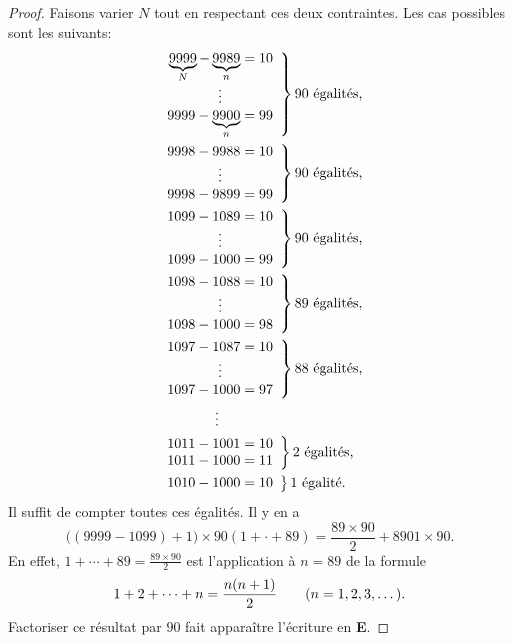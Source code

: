 \begin{proof}
Faisons varier $N$ tout en respectant ces deux contraintes. Les cas possibles sont les suivants:
%
\begin{align}
  &\left.
  \begin{array}{r@{{}={}}l}
    \underbrace{9999}_{N} - \underbrace{9989}_{n} & 10 \\
    \multicolumn{2}{c}{\vdots} \\
    9999 - \underbrace{9900}_{n} & 99
  \end{array}
  \right\} 90 \text{ égalités,}\\
%
%
%
  &\left.
  \begin{array}{r@{{}={}}l}
    9998 - 9988 & 10 \\
    \multicolumn{2}{c}{\vdots} \\
  9998 - 9899 & 99
  \end{array}
  \right\} 90 \text{ égalités,}\\
%
%
  &\left.
  \begin{array}{r@{{}={}}l}
    1099 - 1089 & 10 \\
    \multicolumn{2}{c}{\vdots} \\
  1099 - 1000 & 99
  \end{array}
  \right\} 90 \text{ égalités,}\\
%
  &\left.
  \begin{array}{r@{{}={}}l}
    1098 - 1088 & 10 \\
    \multicolumn{2}{c}{\vdots} \\
  1098 - 1000 & 98
  \end{array}
  \right\} 89 \text{ égalités,}\\
%
  &\left.
  \begin{array}{r@{{}={}}l}
    1097 - 1087 & 10 \\
    \multicolumn{2}{c}{\vdots} \\
  1097 - 1000 & 97
  \end{array}
  \right\} 88 \text{ égalités,}\\
%
& \hspace{4.2em}\vdots\\\nonumber
%
  &\left.
  \begin{array}{r@{{}={}}l}
    1011 - 1001 & 10 \\
   1011 - 1000 & 11  
  \end{array}
  \right\} 2 \text{ égalités,}\\
%
  &\left.
  \begin{array}{r@{{}={}}l}
    1010 - 1000 & 10 
  \end{array}
  \right\} 1 \text{ égalité. }
\end{align}
%
Il suffit de compter toutes ces égalités. Il y en a
%
\begin{equation}
\bigl((9999-1099) +1 \bigr) \times 90   (1+\cdot+89)  = \frac{89 \times 90}{2} + 8901 \times 90.
\end{equation}
En effet, %
$1+\cdots+89=\frac{89 \times 90}{2}$ est l'application à $n=89$ de la formule 
\begin{equation}
  1 + 2 +\cdots + n = \frac{n(n+1)}{2} \qquad (n=1, 2, 3, \dots).
\end{equation}
%
Factoriser ce résultat par $90$ fait apparaître l'écriture en \textbf{E}.
\end{proof}